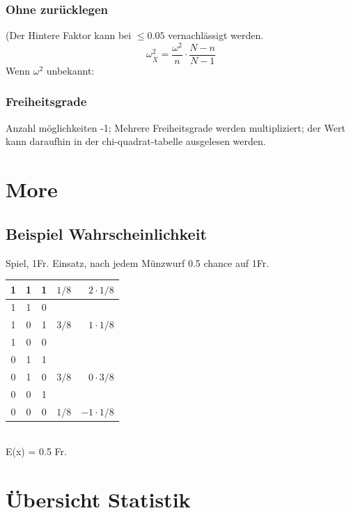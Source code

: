 \subsubsection{Ohne zurücklegen}

(Der Hintere Faktor kann bei $\leq 0.05$ vernachlässigt werden.
\[
	\omega^2_{\overline{X}} = \frac{\omega^2}{n} \cdot \frac{N -n}{N-1}
\]
Wenn $\omega^2$ unbekannt:


\subsubsection{Freiheitsgrade}

Anzahl möglichkeiten -1; Mehrere Freiheitsgrade werden multipliziert; der Wert kann daraufhin in der chi-quadrat-tabelle ausgelesen werden.


\section{More}

\subsection{Beispiel Wahrscheinlichkeit}
	
	Spiel, 1Fr. Einsatz, nach jedem Münzwurf 0.5 chance auf 1Fr.
	\\
	
	\begin{tabu}{| c c c | c | r |}
		 & 1 & 1 & $1/8$ & $2 \cdot 1/8$ \\
		 & 1 & 0 & & \\
		1 & 0 & 1 & $3/8$ & $1 \cdot 1/8$ \\
		1 & 0 & 0 &  &  \\
		 & 1 & 1 &  & \\
		0 & 1 & 0 & $3/8$ & $0 \cdot 3/8$ \\
		0 & 0 & 1 &  &  \\
		 & 0 & 0 & $1/8$ & $-1 \cdot 1/8$ \\
		\hline
		
	\end{tabu}
	\\
	
	E(x) = 0.5 Fr.



\section{Übersicht Statistik}

